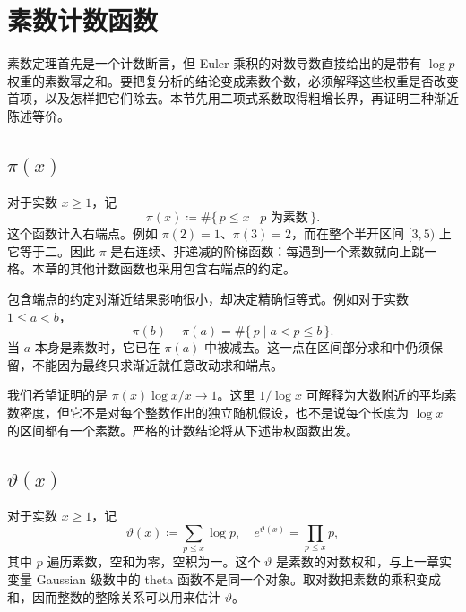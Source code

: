 \section{素数计数函数}
\label{b3:sec:2701}

素数定理首先是一个计数断言，但 Euler 乘积的对数导数直接给出的是带有 \(\log p\) 权重的素数幂之和。要把复分析的结论变成素数个数，必须解释这些权重是否改变首项，以及怎样把它们除去。本节先用二项式系数取得粗增长界，再证明三种渐近陈述等价。

\subsection{\texorpdfstring{\(\pi(x)\)}{\AnalysisPdfPi(x)}}
\label{b3:subsec:270101}

对于实数 \(x\ge1\)，记
\[
 \pi(x)\coloneqq\#\{\,p\le x\mid p\text{ 为素数}\,\}.
\]
这个函数计入右端点。例如 \(\pi(2)=1\)、\(\pi(3)=2\)，而在整个半开区间 \([3,5)\) 上它等于二。因此 \(\pi\) 是右连续、非递减的阶梯函数：每遇到一个素数就向上跳一格。本章的其他计数函数也采用包含右端点的约定。

\ProseParagraphBreak

包含端点的约定对渐近结果影响很小，却决定精确恒等式。例如对于实数 \(1\le a<b\)，
\[
 \pi(b)-\pi(a)=\#\{\,p\mid a<p\le b\,\}.
\]
当 \(a\) 本身是素数时，它已在 \(\pi(a)\) 中被减去。这一点在区间部分求和中仍须保留，不能因为最终只求渐近就任意改动求和端点。

\ProseParagraphBreak

我们希望证明的是 \(\pi(x)\log x/x\to1\)。这里 \(1/\log x\) 可解释为大数附近的平均素数密度，但它不是对每个整数作出的独立随机假设，也不是说每个长度为 \(\log x\) 的区间都有一个素数。严格的计数结论将从下述带权函数出发。

\subsection{\texorpdfstring{\(\vartheta(x)\)}{\AnalysisPdfVarTheta(x)}}
\label{b3:subsec:270102}

对于实数 \(x\ge1\)，记
\[
 \vartheta(x)\coloneqq\sum_{p\le x}\log p,
 \quad
 e^{\vartheta(x)}=\prod_{p\le x}p,
\]
其中 \(p\) 遍历素数，空和为零，空积为一。这个 \(\vartheta\) 是素数的对数权和，与上一章实变量 Gaussian 级数中的 theta 函数不是同一个对象。取对数把素数的乘积变成和，因而整数的整除关系可以用来估计 \(\vartheta\)。

